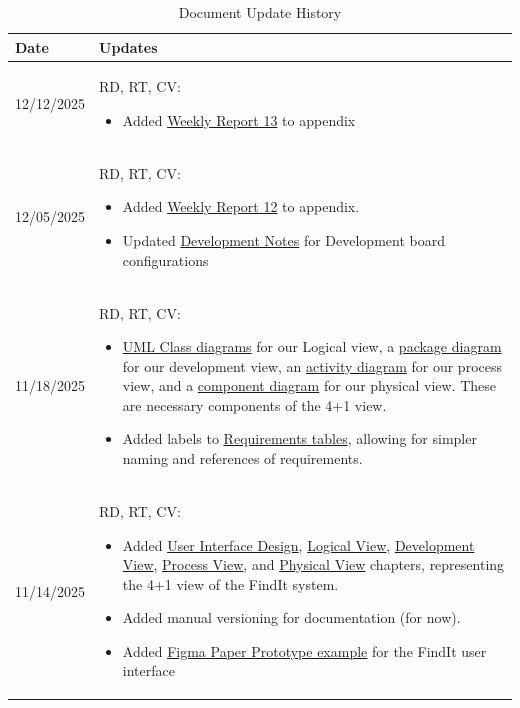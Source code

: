 \begin{longtable}{|l||p{13.5cm}|}
\caption{Document Update History \label{Table::UpdateHistory}}\\
\hline
\textbf{Date} & \textbf{Updates} \\
\hline 
\endhead

12/12/2025 & RD, RT, CV:
\begin{itemize}[topsep=0pt,itemsep=0pt,parsep=0pt,partopsep=0pt,leftmargin=12pt]
    \item Added \hyperref[sec:report13]{Weekly Report 13} to appendix
\end{itemize}
\\ \hline

12/05/2025 & RD, RT, CV:
\begin{itemize}[topsep=0pt,itemsep=0pt,parsep=0pt,partopsep=0pt,leftmargin=12pt]
    \item Added \hyperref[sec:report12]{Weekly Report 12} to appendix.
    \item Updated \hyperref[Chapter::DevelopmentNotes]{Development Notes} for Development board configurations
\end{itemize}
\\ \hline

11/18/2025 & RD, RT, CV:
\begin{itemize}[topsep=0pt,itemsep=0pt,parsep=0pt,partopsep=0pt,leftmargin=12pt]
    \item  \hyperref[fig:FirmwareClasses]{UML Class diagrams} for our Logical view, a \hyperref[fig:packageDiagram]{package diagram} for our development view, an \hyperref[fig:ucMultiResidentMonitoringActivity]{activity diagram} for our process view, and a \hyperref[fig:componentDiagram]{component diagram} for our physical view. These are necessary components of the 4+1 view.
    \item Added labels to \hyperref[Table::RequirementsUser]{Requirements tables}, allowing for simpler naming and references of requirements.
\end{itemize}
\\ \hline

11/14/2025 & RD, RT, CV:
\begin{itemize}[topsep=0pt,itemsep=0pt,parsep=0pt,partopsep=0pt,leftmargin=12pt]
    \item Added \hyperref[Chapter::UserInterfaceDesign]{User Interface Design}, \hyperref[Chapter::LogicalView]{Logical View}, \hyperref[Chapter::DevelopmentView]{Development View}, \hyperref[Chapter::ProcessView]{Process View}, and \hyperref[Chapter::PhysicalView]{Physical View} chapters, representing the 4+1 view of the FindIt system.
    \item Added manual versioning for documentation (for now).
    \item Added \hyperref[fig:figmaUI]{Figma Paper Prototype example} for the FindIt user interface
\end{itemize}
\\ \hline


\end{longtable}
